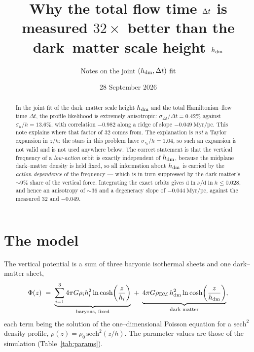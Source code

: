 \documentclass[11pt,a4paper]{article}
\title{Why the total flow time $\dt$ is measured $32\times$ better than the
dark--matter scale height $\hdm$}
\author{Notes on the joint $(\hdm,\dt)$ fit}
\date{28 September 2026}
\newcommand{\hdm}{h_{\rm dm}}
\newcommand{\dt}{\Delta t}
\begin{document}
\maketitle

\begin{abstract}
In the joint fit of the dark--matter scale height $\hdm$ and the total
Hamiltonian--flow time $\dt$, the profile likelihood is extremely anisotropic:
$\sigma_{\dt}/\dt = 0.42\%$ against $\sigma_{h}/h = 13.6\%$, with correlation
$-0.982$ along a ridge of slope $-0.049\ \mathrm{Myr/pc}$.  This note explains
where that factor of $32$ comes from.  The explanation is \emph{not} a Taylor
expansion in $z/h$: the stars in this problem have $\sigma_{z_0}/h = 1.04$, so
such an expansion is not valid and is not used anywhere below.  The correct
statement is that the vertical frequency of a \emph{low-action} orbit is exactly
independent of $\hdm$, because the midplane dark--matter density is held fixed,
so all information about $\hdm$ is carried by the \emph{action dependence} of the
frequency --- which is in turn suppressed by the dark matter's $\sim\!9\%$ share
of the vertical force.  Integrating the exact orbits gives
$\mathrm{d}\ln\nu/\mathrm{d}\ln h \le 0.028$, and hence an anisotropy of
$\sim\!36$ and a degeneracy slope of $-0.044\ \mathrm{Myr/pc}$, against the
measured $32$ and $-0.049$.
\end{abstract}

\section{The model}

The vertical potential is a sum of three baryonic isothermal sheets and one
dark--matter sheet,
\begin{equation}
  \Phi(z) \;=\; \underbrace{\sum_{i=1}^{3} 4\pi G\rho_i h_i^2
                  \ln\cosh\!\left(\frac{z}{h_i}\right)}_{\text{baryons, fixed}}
            \;+\; \underbrace{4\pi G\rho_{\rm DM}\,\hdm^2
                  \ln\cosh\!\left(\frac{z}{\hdm}\right)}_{\text{dark matter}},
  \label{eq:phi}
\end{equation}
each term being the solution of the one--dimensional Poisson equation for a
$\mathrm{sech}^2$ density profile, $\rho(z)=\rho_0\,\mathrm{sech}^2(z/h)$.  The
parameter values are those of the simulation (Table~\ref{tab:params}).
\end{document}
